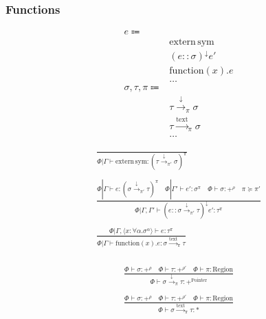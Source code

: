 \documentclass {article}
\begin{document}
\subsubsection{Functions}

\begin{align*}
e \Coloneqq & \\
& \text{extern} \, \text{sym} \tag{Extern Function} \\
& (e :: \sigma) ^\downarrow e' \tag{Function Pointer Application} \\
& \text{function} (x). e \tag{Function Literal} \\
& \dots \\
\sigma, \tau, \pi \Coloneqq & \\
& \tau \xrightarrow{\downarrow}_\pi \sigma \tag{Function Pointer}\\
& \tau \xrightarrow{\text{text}}_\pi \sigma  \tag{Function Literal Type} \\
& \dots
\end{align*}

\begin{gather*}
\frac
{}
{\Phi | \Gamma \vdash \text{extern} \, \text{sym} : (\tau \xrightarrow{\downarrow}_{\pi'} \sigma)^\pi} \\
\\
\frac
{\Phi | \Gamma \vdash e : (\sigma \xrightarrow{\downarrow}_{\pi'} \tau)^\pi \quad \Phi | \Gamma' \vdash e' : \sigma^\pi \quad \Phi \vdash \sigma : +^{\rho} \quad \pi \succeq \pi'}
{\Phi | \Gamma, \Gamma' \vdash (e :: \sigma \xrightarrow{\downarrow}_{\pi'} \tau)^\downarrow e' : \tau^\pi} \\
\\
\frac
{\Phi | \Gamma, \langle x : \forall \alpha. \sigma^\alpha \rangle \vdash e : \tau^\pi}
{\Phi | \Gamma \vdash \text{function}(x). e : \sigma \xrightarrow{\text{text}}_\pi \tau} \\
\end{gather*}

\begin{gather*}
\frac
{\Phi \vdash \sigma : +^{\rho} \quad \Phi \vdash \tau : +^{\rho'} \quad \Phi \vdash \pi : \text{Region}}
{\Phi \vdash \sigma \xrightarrow{\downarrow}_\pi \tau : +^{\text{Pointer}}} \\
\\
\frac
{\Phi \vdash \sigma : +^{\rho} \quad \Phi \vdash \tau : +^{\rho'} \quad \Phi \vdash \pi : \text{Region}}
{\Phi \vdash \sigma \xrightarrow{\text{text}}_\pi \tau : *} \\
\end{gather*}
\end{document}
